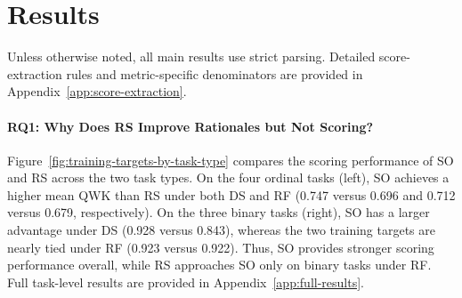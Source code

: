 \section{Results}
\label{sec:results}
\raggedbottom

Unless otherwise noted, all main results use strict parsing. Detailed
score-extraction rules and metric-specific denominators are provided in
Appendix~\ref{app:score-extraction}.

\paragraph{RQ1: Why Does RS Improve Rationales but Not Scoring?}


Figure~\ref{fig:training-targets-by-task-type} compares the scoring
performance of SO and RS across the two task types. On the four ordinal
tasks (left), SO achieves a higher mean QWK than RS under both DS and RF
(0.747 versus 0.696 and 0.712 versus 0.679, respectively). On the three
binary tasks (right), SO has a larger advantage under DS (0.928 versus
0.843), whereas the two training targets are nearly tied under RF
(0.923 versus 0.922). Thus, SO provides stronger scoring performance
overall, while RS approaches SO only on binary tasks under RF. Full
task-level results are provided in Appendix~\ref{app:full-results}.



